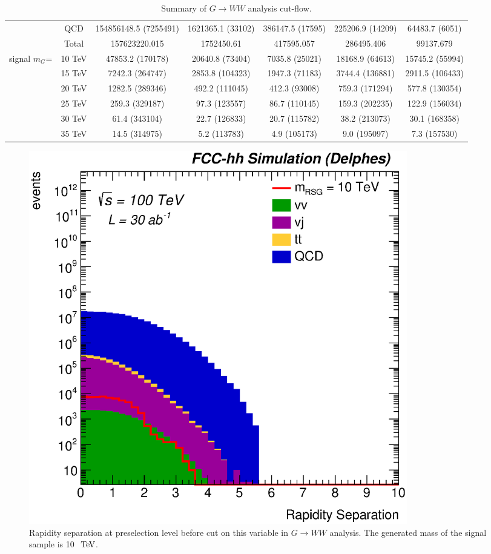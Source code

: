 \documentclass{cernrep}
\begin{document}
\begin{landscape}
\begin{table}[!htb]
{\begin{tabular}{|c|c|c|c|c|c|c|}
                & QCD           & 154856148.5 (7255491) & 1621365.1 (33102) & 386147.5 (17595) & 225206.9 (14209) & 64483.7 (6051)   \\
                & Total         & 157623220.015         & 1752450.61        & 417595.057       & 286495.406       & 99137.679        \\
\hline
signal $m_{G}$= & 10 TeV        & 47853.2 (170178)      & 20640.8 (73404)   & 7035.8 (25021)   & 18168.9 (64613)  & 15745.2 (55994) \\
                & 15 TeV        & 7242.3 (264747)       & 2853.8 (104323)   & 1947.3 (71183)   & 3744.4 (136881)  & 2911.5 (106433) \\
                & 20 TeV        & 1282.5 (289346)       & 492.2 (111045)    & 412.3 (93008)    & 759.3 (171294)   & 577.8 (130354)  \\
                & 25 TeV        & 259.3 (329187)        & 97.3 (123557)     & 86.7 (110145)    & 159.3 (202235)   & 122.9 (156034)  \\
                & 30 TeV        & 61.4 (343104)         & 22.7 (126833)     & 20.7 (115782)    & 38.2 (213073)    & 30.1 (168358)   \\
                & 35 TeV        & 14.5 (314975)         & 5.2 (113783)      & 4.9 (105173)     & 9.0 (195097)     & 7.3 (157530)    \\
\hline
\hline
\end{tabular}}
\caption{Summary of $G \rightarrow WW$ analysis cut-flow.}
\label{tab:RSGww_cutflow}
\end{table}
\end{landscape}

\begin{figure}[!htb]\centering
\includegraphics[width=0.8\textwidth]{Fig/RSGww/rapiditySeparation_sel0_before_cut_nostack_log.eps}
\caption{Rapidity separation at preselection level before cut on this variable in $G \rightarrow WW$ analysis. The generated mass of the signal sample is 10 $\TeV$.}
\label{fig:RSGww_sel0_rapidity}
\end{figure}
\end{document}
